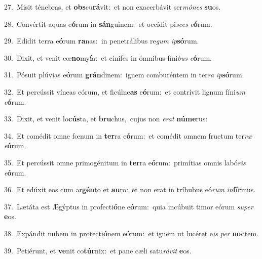 {\numbfont\textcolor{\numbcolor}{27.}}~Misit ténebras, et \textbf{obs}\-cu\-\textbf{rá}\-vit:~\star et non exacerbávit ser\-\textit{mó}\-\textit{nes} \textbf{su}\-os.\par
{\numbfont\textcolor{\numbcolor}{28.}}~Convértit aquas e\-\textbf{ó}\-rum in \textbf{sán}\-guinem:~\star et occídit pi\textit{sces} \textit{e}\-\textbf{ó}rum.\par
{\numbfont\textcolor{\numbcolor}{29.}}~Edidit terra e\-\textbf{ó}\-rum \textbf{ra}\-nas:~\star in penetrálibus re\textit{gum} \textit{ip}\-\textbf{só}rum.\par
{\numbfont\textcolor{\numbcolor}{30.}}~Dixit, et venit cœ\-\textbf{no}\-my\-\textbf{í}\-a:~\star et cínifes in ómnibus fíni\textit{bus} \textit{e}\-\textbf{ó}rum.\par
{\numbfont\textcolor{\numbcolor}{31.}}~Pósuit plúvias e\-\textbf{ó}\-rum \textbf{grán}\-dinem:~\star ignem comburéntem in ter\textit{ra} \textit{ip}\-\textbf{só}rum.\par
{\numbfont\textcolor{\numbcolor}{32.}}~Et percússit víneas eórum, et ficúlne\textbf{as} e\-\textbf{ó}\-rum:~\star et contrívit lignum fíni\textit{um} \textit{e}\-\textbf{ó}rum.\par
{\numbfont\textcolor{\numbcolor}{33.}}~Dixit, et venit lo\-\textbf{cús}\-ta, et \textbf{bru}\-chus,~\star cujus non \textit{e}\-\textit{rat} \textbf{nú}\-\textbf{me}rus:\par
{\numbfont\textcolor{\numbcolor}{34.}}~Et comédit omne fœnum in \textbf{ter}\-ra e\-\textbf{ó}\-rum:~\star et comédit omnem fructum ter\textit{ræ} \textit{e}\-\textbf{ó}rum.\par
{\numbfont\textcolor{\numbcolor}{35.}}~Et percússit omne primogénitum in \textbf{ter}\-ra e\-\textbf{ó}\-rum:~\star primítias omnis labó\textit{ris} \textit{e}\-\textbf{ó}rum.\par
{\numbfont\textcolor{\numbcolor}{36.}}~Et edúxit eos cum ar\-\textbf{gén}\-to et \textbf{au}\-ro:~\star et non erat in tríbubus eó\textit{rum} \textit{in}\-\textbf{fír}mus.\par
{\numbfont\textcolor{\numbcolor}{37.}}~Lætáta est Ægýptus in profecti\-\textbf{ó}\-ne e\-\textbf{ó}\-rum:~\star quia incúbuit timor eórum \textit{su}\-\textit{per} \textbf{e}\-os.\par
{\numbfont\textcolor{\numbcolor}{38.}}~Expándit nubem in protecti\-\textbf{ó}\-nem e\-\textbf{ó}\-rum:~\star et ignem ut lucéret e\textit{is} \textit{per} \textbf{noc}\-tem.\par
{\numbfont\textcolor{\numbcolor}{39.}}~Petiérunt, et \textbf{ve}\-nit co\-\textbf{túr}\-nix:~\star et pane cæli satu\-\textit{rá}\-\textit{vit} \textbf{e}\-os.\par
